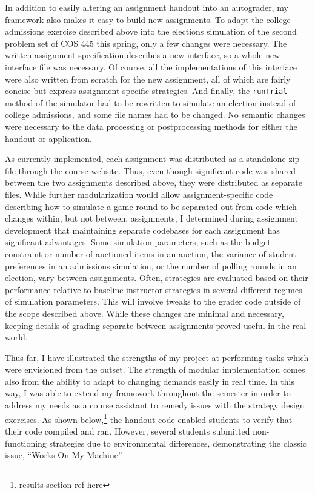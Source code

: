 \documentclass[pageno]{jpaper}
\begin{document}
In addition to easily altering an assignment handout into an autograder, my framework also makes it easy to build new assignments.
To adapt the college admissions exercise described above into the elections simulation of the second problem set of COS 445 this spring, only a few changes were necessary.
The written assignment specification describes a new interface, so a whole new interface file was necessary.
Of course, all the implementations of this interface were also written from scratch for the new assignment, all of which are fairly concise but express assignment-specific strategies.
And finally, the \texttt{runTrial} method of the simulator had to be rewritten to simulate an election instead of college admissions, and some file names had to be changed.
No semantic changes were necessary to the data processing or postprocessing methods for either the handout or application.

As currently implemented, each assignment was distributed as a standalone zip file through the course website.
Thus, even though significant code was shared between the two assignments described above, they were distributed as separate files.
While further modularization would allow assignment-specific code describing how to simulate a game round to be separated out from code which changes within, but not between, assignments, I determined during assignment development that maintaining separate codebases for each assignment has significant advantages.
Some simulation parameters, such as the budget constraint or number of auctioned items in an auction, the variance of student preferences in an admissions simulation, or the number of polling rounds in an election, vary between assignments.
Often, strategies are evaluated based on their performance relative to baseline instructor strategies in several different regimes of simulation parameters.
This will involve tweaks to the grader code outside of the scope described above.
While these changes are minimal and necessary, keeping details of grading separate between assignments proved useful in the real world.

Thus far, I have illustrated the strengths of my project at performing tasks which were envisioned from the outset.
The strength of modular implementation comes also from the ability to adapt to changing demands easily in real time.
In this way, I was able to extend my framework throughout the semester in order to address my needs as a course assistant to remedy issues with the strategy design exercises.
As shown below,\footnote{results section ref here} the handout code enabled students to verify that their code compiled and ran.
However, several students submitted non-functioning strategies due to environmental differences, demonstrating the classic issue, ``Works On My Machine''.
\end{document}
